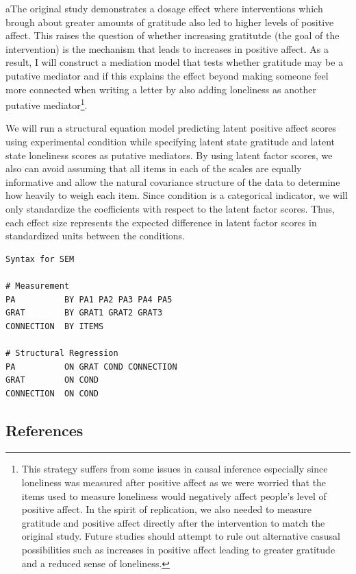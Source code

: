\documentclass[
  letterpaper,
  DIV=11,
  numbers=noendperiod]{scrartcl}
\begin{document}
aThe original study demonstrates a dosage effect where interventions
which brough about greater amounts of gratitude also led to higher
levels of positive affect. This raises the question of whether
increasing gratitutde (the goal of the intervention) is the mechanism
that leads to increases in positive affect. As a result, I will
construct a mediation model that tests whether gratitude may be a
putative mediator and if this explains the effect beyond making someone
feel more connected when writing a letter by also adding loneliness as
another putative mediator\footnote{This strategy suffers from some
  issues in causal inference especially since loneliness was measured
  after positive affect as we were worried that the items used to
  measure loneliness would negatively affect people's level of positive
  affect. In the spirit of replication, we also needed to measure
  gratitude and positive affect directly after the intervention to match
  the original study. Future studies should attempt to rule out
  alternative casusal possibilities such as increases in positive affect
  leading to greater gratitude and a reduced sense of loneliness.}.

We will run a structural equation model predicting latent positive
affect scores using experimental condition while specifying latent state
gratitude and latent state loneliness scores as putative mediators. By
using latent factor scores, we also can avoid assuming that all items in
each of the scales are equally informative and allow the natural
covariance structure of the data to determine how heavily to weigh each
item. Since condition is a categorical indicator, we will only
standardize the coefficients with respect to the latent factor scores.
Thus, each effect size represents the expected difference in latent
factor scores in standardized units between the conditions.

\begin{verbatim}
Syntax for SEM

# Measurement 
PA          BY PA1 PA2 PA3 PA4 PA5
GRAT        BY GRAT1 GRAT2 GRAT3
CONNECTION  BY ITEMS

# Structural Regression
PA          ON GRAT COND CONNECTION
GRAT        ON COND
CONNECTION  ON COND
\end{verbatim}

\subsection{References}\label{references}
\end{document}
